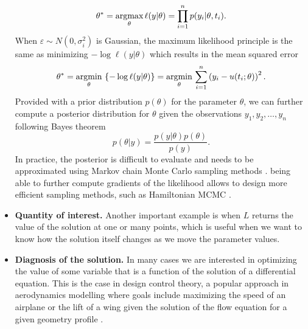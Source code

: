 \begin{itemize}
\begin{equation}
        \theta^* 
        = 
        \underset{\theta}{\text{argmax}} \, \ell (y | \theta) 
        = 
        \prod_{i=1}^n p(y_i | \theta, t_i) .
    \end{equation}
    When $\varepsilon \sim N(0, \sigma_i^2)$ is Gaussian, the maximum likelihood principle is the same as minimizing $- \log \ell(y | \theta)$ which results in the mean squared error
    \begin{equation}
        \theta^* 
        = 
        \underset{\theta}{\text{argmin}} \, \left \{ - \log \ell (y | \theta) \right \}
        = 
        \underset{\theta}{\text{argmin}} \, \sum_{i=1}^n \left( y_i - u(t_i; \theta) \right)^2 .
    \end{equation} %
    Provided with a prior distribution $p(\theta)$ for the parameter $\theta$, we can further compute a posterior distribution for $\theta$ given the observations $y_1, y_2, \ldots, y_n$ following Bayes theorem 
    \begin{equation}
        p(\theta | y) = \frac{p(y | \theta) p (\theta)}{p(y)}. 
    \end{equation}
    In practice, the posterior is difficult to evaluate and needs to be approximated using Markov chain Monte Carlo sampling methods \cite{gelman2013bayesian}. being able to further compute gradients of the likelihood allows to design more efficient sampling methods, such as Hamiltonian MCMC \cite{Betancourt_2017}. 
    \item \textbf{Quantity of interest.} Another important example is when $L$ returns the value of the solution at one or many points, which is useful when we want to know how the solution itself changes as we move the parameter values. 
    \item \textbf{Diagnosis of the solution.} In many cases we are interested in optimizing the value of some variable that is a function of the solution of a differential equation. This is the case in design control theory, a popular approach in aerodynamics modelling where goals include maximizing the speed of an airplane or the lift of a wing given the solution of the flow equation for a given geometry profile \cite{Jameson_1988}. 
\end{itemize}


